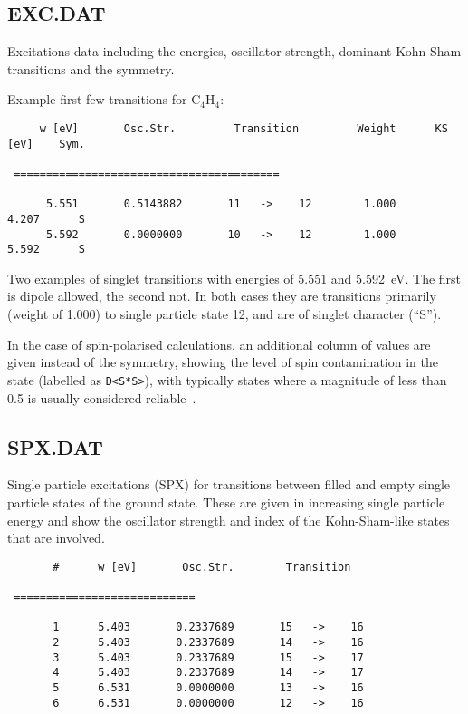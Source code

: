 \subsection{EXC.DAT}

Excitations data including the energies, oscillator strength, dominant Kohn-Sham
transitions and the symmetry.

Example first few transitions for C$_4$H$_4$:

\begin{verbatim}
     w [eV]       Osc.Str.         Transition         Weight      KS [eV]    Sym.

 =========================================

      5.551       0.5143882       11   ->    12        1.000       4.207      S
      5.592       0.0000000       10   ->    12        1.000       5.592      S
\end{verbatim}

Two examples of singlet transitions with energies of 5.551 and 5.592~eV. The
first is dipole allowed, the second not. In both cases they are transitions
primarily (weight of 1.000) to single particle state 12, and are of singlet
character (``S'').

In the case of spin-polarised calculations, an additional column of values are
given instead of the symmetry, showing the level of spin contamination in the
state (labelled as \verb|D<S*S>|), with typically states where a magnitude of
less than 0.5 is usually considered reliable~\cite{garcia14Thesis}.

\subsection{SPX.DAT}

Single particle excitations (SPX) for transitions between filled and empty single
particle states of the ground state. These are given in increasing single
particle energy and show the oscillator strength and index of the Kohn-Sham-like
states that are involved.

\begin{verbatim}
       #      w [eV]       Osc.Str.        Transition

 ============================

       1      5.403       0.2337689       15   ->    16
       2      5.403       0.2337689       14   ->    16
       3      5.403       0.2337689       15   ->    17
       4      5.403       0.2337689       14   ->    17
       5      6.531       0.0000000       13   ->    16
       6      6.531       0.0000000       12   ->    16
\end{verbatim}

